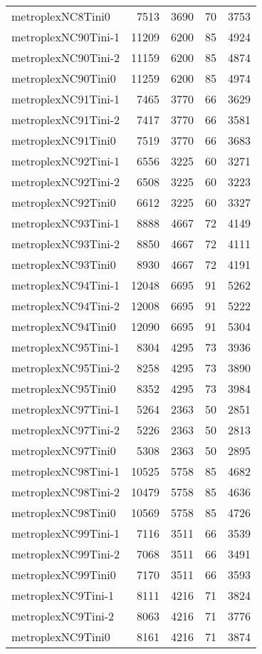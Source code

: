 \begin{longtable}{lrrrr}
metroplexNC8Tini0 & 7513 & 3690 & 70 & 3753 \\
metroplexNC90Tini-1 & 11209 & 6200 & 85 & 4924 \\
metroplexNC90Tini-2 & 11159 & 6200 & 85 & 4874 \\
metroplexNC90Tini0 & 11259 & 6200 & 85 & 4974 \\
metroplexNC91Tini-1 & 7465 & 3770 & 66 & 3629 \\
metroplexNC91Tini-2 & 7417 & 3770 & 66 & 3581 \\
metroplexNC91Tini0 & 7519 & 3770 & 66 & 3683 \\
metroplexNC92Tini-1 & 6556 & 3225 & 60 & 3271 \\
metroplexNC92Tini-2 & 6508 & 3225 & 60 & 3223 \\
metroplexNC92Tini0 & 6612 & 3225 & 60 & 3327 \\
metroplexNC93Tini-1 & 8888 & 4667 & 72 & 4149 \\
metroplexNC93Tini-2 & 8850 & 4667 & 72 & 4111 \\
metroplexNC93Tini0 & 8930 & 4667 & 72 & 4191 \\
metroplexNC94Tini-1 & 12048 & 6695 & 91 & 5262 \\
metroplexNC94Tini-2 & 12008 & 6695 & 91 & 5222 \\
metroplexNC94Tini0 & 12090 & 6695 & 91 & 5304 \\
metroplexNC95Tini-1 & 8304 & 4295 & 73 & 3936 \\
metroplexNC95Tini-2 & 8258 & 4295 & 73 & 3890 \\
metroplexNC95Tini0 & 8352 & 4295 & 73 & 3984 \\
metroplexNC97Tini-1 & 5264 & 2363 & 50 & 2851 \\
metroplexNC97Tini-2 & 5226 & 2363 & 50 & 2813 \\
metroplexNC97Tini0 & 5308 & 2363 & 50 & 2895 \\
metroplexNC98Tini-1 & 10525 & 5758 & 85 & 4682 \\
metroplexNC98Tini-2 & 10479 & 5758 & 85 & 4636 \\
metroplexNC98Tini0 & 10569 & 5758 & 85 & 4726 \\
metroplexNC99Tini-1 & 7116 & 3511 & 66 & 3539 \\
metroplexNC99Tini-2 & 7068 & 3511 & 66 & 3491 \\
metroplexNC99Tini0 & 7170 & 3511 & 66 & 3593 \\
metroplexNC9Tini-1 & 8111 & 4216 & 71 & 3824 \\
metroplexNC9Tini-2 & 8063 & 4216 & 71 & 3776 \\
metroplexNC9Tini0 & 8161 & 4216 & 71 & 3874 \\
\end{longtable}
